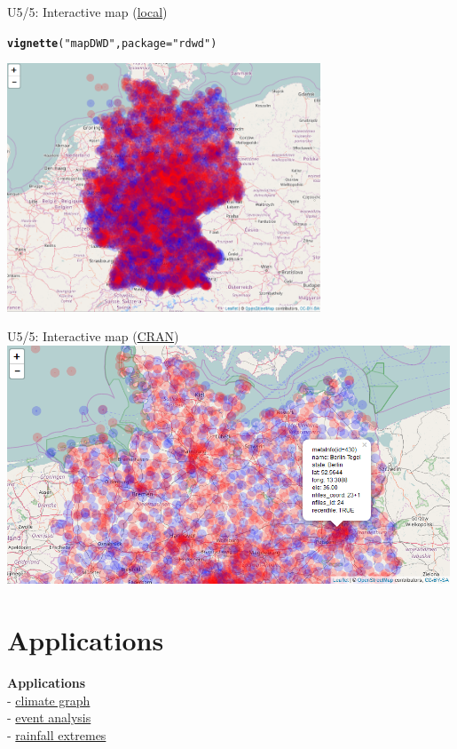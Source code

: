 \documentclass[compress, xcolor=dvipsnames]{beamer}\usepackage[]{graphicx}\usepackage[]{color}
\makeatletter
\newcommand{\hlstr}[1]{\textcolor[rgb]{0.192,0.494,0.8}{#1}}%
\newcommand{\hlstd}[1]{\textcolor[rgb]{0.345,0.345,0.345}{#1}}%
\newcommand{\hlkwc}[1]{\textcolor[rgb]{0.333,0.667,0.333}{#1}}%
\newcommand{\hlkwd}[1]{\textcolor[rgb]{0.737,0.353,0.396}{\textbf{#1}}}%
\newenvironment{kframe}{%
 \def\at@end@of@kframe{}%
 \ifinner\ifhmode%
  \def\at@end@of@kframe{\end{minipage}}%
  \begin{minipage}{\columnwidth}%
 \fi\fi%
 \def\FrameCommand##1{\hskip\@totalleftmargin \hskip-\fboxsep
 \colorbox{shadecolor}{##1}\hskip-\fboxsep
     \hskip-\linewidth \hskip-\@totalleftmargin \hskip\columnwidth}%
 \MakeFramed {\advance\hsize-\width
   \@totalleftmargin\z@ \linewidth\hsize
   \@setminipage}}%
 {\par\unskip\endMakeFramed%
 \at@end@of@kframe}
\newenvironment{knitrout}{}{} %
\makeatother
\begin{document}
\begin{frame}[fragile]{U5/5: Interactive map (\href{../inst/doc/mapDWD.html}{local})}
\label{um}
\begin{knitrout}
\color{fgcolor}\begin{kframe}
\begin{alltt}
\hlkwd{vignette}\hlstd{(}\hlstr{"mapDWD"}\hlstd{,} \hlkwc{package}\hlstd{=}\hlstr{"rdwd"}\hlstd{)}
\end{alltt}
\end{kframe}
\end{knitrout}
\includegraphics[width=0.7\textwidth]{map1.png}
\end{frame}


\begin{frame}[fragile]{U5/5: Interactive map (\href{https://cran.r-project.org/web/packages/rdwd/vignettes/mapDWD.html}{CRAN})}
\includegraphics[width=0.99\textwidth]{map2.png}
\end{frame}

\section{Applications}
\begin{frame}
\textbf{Applications}\\[1em]
- \hyperlink{ac}{climate graph}\\
- \hyperlink{ae}{event analysis}\\
- \hyperlink{ar}{rainfall extremes}\\
\end{frame}
\end{document}
